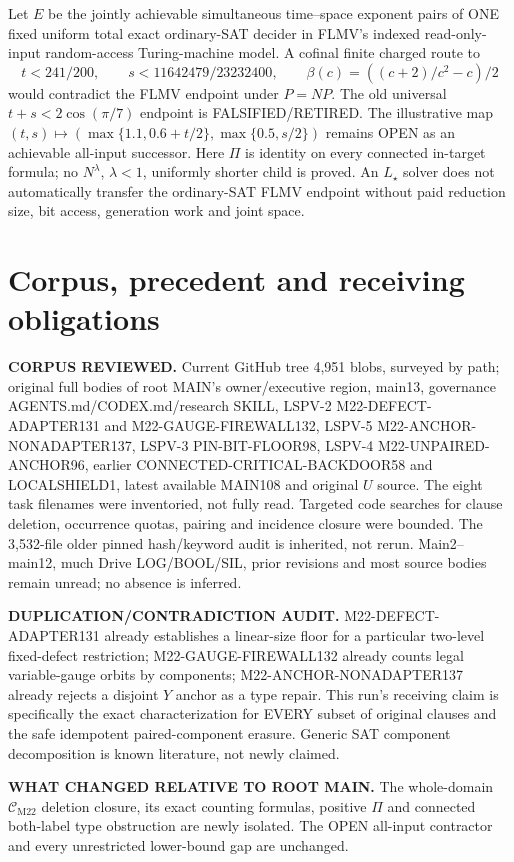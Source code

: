 \documentclass[11pt]{article}
\newcommand{\CM}{\mathcal C_{\mathrm{M22}}}
\begin{document}
Let $E$ be the jointly achievable simultaneous time--space exponent pairs of ONE fixed uniform total exact ordinary-SAT decider in FLMV's indexed read-only-input random-access Turing-machine model. A cofinal finite charged route to
\[
t<241/200,\qquad s<11642479/23232400,\qquad
\beta(c)=((c+2)/c^2-c)/2
\]
would contradict the FLMV endpoint under $P=NP$. The old universal $t+s<2\cos(\pi/7)$ endpoint is FALSIFIED/RETIRED. The illustrative map $(t,s)\mapsto(\max\{1.1,0.6+t/2\},\max\{0.5,s/2\})$ remains OPEN as an achievable all-input successor. Here $\Pi$ is identity on every connected in-target formula; no $N^\lambda$, $\lambda<1$, uniformly shorter child is proved. An $L_\star$ solver does not automatically transfer the ordinary-SAT FLMV endpoint without paid reduction size, bit access, generation work and joint space.

\section{Corpus, precedent and receiving obligations}
\noindent\textbf{CORPUS REVIEWED.} Current GitHub tree 4,951 blobs, surveyed by path; original full bodies of root MAIN's owner/executive region, main13, governance AGENTS.md/CODEX.md/research SKILL, LSPV-2 M22-DEFECT-ADAPTER131 and M22-GAUGE-FIREWALL132, LSPV-5 M22-ANCHOR-NONADAPTER137, LSPV-3 PIN-BIT-FLOOR98, LSPV-4 M22-UNPAIRED-ANCHOR96, earlier CONNECTED-CRITICAL-BACKDOOR58 and LOCALSHIELD1, latest available MAIN108 and original $U$ source. The eight task filenames were inventoried, not fully read. Targeted code searches for clause deletion, occurrence quotas, pairing and incidence closure were bounded. The 3,532-file older pinned hash/keyword audit is inherited, not rerun. Main2--main12, much Drive LOG/BOOL/SIL, prior revisions and most source bodies remain unread; no absence is inferred.

\noindent\textbf{DUPLICATION/CONTRADICTION AUDIT.} M22-DEFECT-ADAPTER131 already establishes a linear-size floor for a particular two-level fixed-defect restriction; M22-GAUGE-FIREWALL132 already counts legal variable-gauge orbits by components; M22-ANCHOR-NONADAPTER137 already rejects a disjoint $Y$ anchor as a type repair. This run's receiving claim is specifically the exact characterization for EVERY subset of original clauses and the safe idempotent paired-component erasure. Generic SAT component decomposition is known literature, not newly claimed.

\noindent\textbf{WHAT CHANGED RELATIVE TO ROOT MAIN.} The whole-domain $\CM$ deletion closure, its exact counting formulas, positive $\Pi$ and connected both-label type obstruction are newly isolated. The OPEN all-input contractor and every unrestricted lower-bound gap are unchanged.
\end{document}
